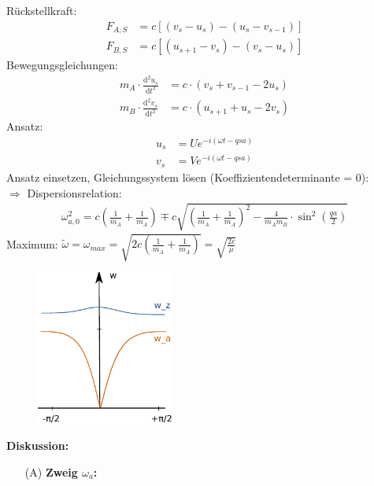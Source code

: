 \begin{itemize}
\begin{figure}[H]
			\caption{}
			\label{fig:4_2kette2}
		\end{figure} 
		Rückstellkraft:
		\begin{align*}
			F_{A,S} &= c \left[(v_s - u_s) - (u_s - v_{s-1})\right] \\
			F_{B,S} &= c \left[(u_{s+1} - v_s) - (v_s - u_{s})\right] 
		\end{align*}
		Bewegungsgleichungen:
		\begin{align*}
			m_A \cdot \frac{\mathrm{d}^2u_s}{\mathrm{d}t^2} &= c \cdot (v_s + v_{s-1} - 2 u_s) \\
			m_B \cdot \frac{\mathrm{d}^2v_s}{\mathrm{d}t^2} &= c \cdot (u_{s+1} + u_s - 2 v_s)
		\end{align*}
		Ansatz:
		\begin{align*}
			u_s &= U e^{-i(\omega t - q s a)} \\
			v_s &= V e^{-i(\omega t - q s a)}
		\end{align*}
		Ansatz einsetzen, Gleichungssystem lösen (Koeffizientendeterminante = 0):\\
		$\Rightarrow$ Dispersionsrelation:
		\begin{align*}
			\omega_{a,0}^2 = c \left( \frac{1}{m_A} + \frac{1}{m_A} \right) \mp c \sqrt{\left( \frac{1}{m_A} + \frac{1}{m_A} \right)^2 - \frac{4}{m_A m_B} \cdot \sin^2 \left(\frac{qa}{2}\right)}
		\end{align*}
		Maximum: $\tilde{\omega} = \omega_{max} = \sqrt{2c \left( \frac{1}{m_A} + \frac{1}{m_A} \right)} = \sqrt{\frac{2c}{\mu}}$
		\begin{figure}[H]
			\centering
			\includegraphics[width=0.4\textwidth]{figures/4_2disp}
			\caption{}
			\label{fig:4_2disp}
		\end{figure}
	\textbf{Diskussion:}\\
	\begin{itemize}
		\item[(A)] \textbf{Zweig $\omega_a$:}\\

\end{itemize}
\end{itemize}
